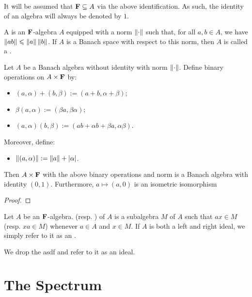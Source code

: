 \begin{remark}
	It will be assumed that $\mathbf{F} \subseteq A$ via the above identification. As such, the identity of an algebra will always be denoted by $1$.
\end{remark}

\begin{definition}
	A  is an $\mathbf{F}$-algebra $A$ equipped with a norm $\left\lVert \cdot \right\rVert$ such that, for all $a,b \in A$, we have $\left\lVert ab \right\rVert \leqslant \left\lVert a \right\rVert \left\lVert b \right\rVert$. If $A$ is a Banach space with respect to this norm, then $A$ is called a . 
\end{definition}

\begin{proposition}
	Let $A$ be a Banach algebra without identity with norm $\left\lVert \cdot \right\rVert$. Define binary operations on $A \times \mathbf{F}$ by:
	\mbox{}
	\begin{itemize}[itemsep=1pt,topsep=3pt]
		\item $(a,\alpha) + (b,\beta) := (a + b, \alpha + \beta)$;
		\item $\beta(a,\alpha) := (\beta a, \beta \alpha)$;
		\item $(a,\alpha)(b,\beta) := (ab + \alpha b + \beta a, \alpha \beta)$.
	\end{itemize}
	Moreover, define: 
	\mbox{}
	\begin{itemize}[itemsep=1pt,topsep=3pt]
		\item $\left\lVert (a,\alpha) \right\rVert := \left\lVert a \right\rVert + |\alpha|$.
	\end{itemize}
	Then $A \times \mathbf{F}$ with the above binary operations and norm is a Banach algebra with identity $(0,1)$. Furthermore, $a \mapsto (a,0)$ is an isometric isomorphism 
\end{proposition}
	{\color{red}
	\begin{proof}
			
	\end{proof}}

\begin{definition}
	Let $A$ be an $\mathbf{F}$-algebra.  (resp. ) of $A$ is a subalgebra $M$ of $A$ such that $ax \in M$ (resp. $xa \in M$) whenever $a \in A$ and $x \in M$. If $A$ is both a left and right ideal, we simply refer to it as an .  


	We drop the asdf and refer to it as an ideal. 
\end{definition}



\section{The Spectrum}

